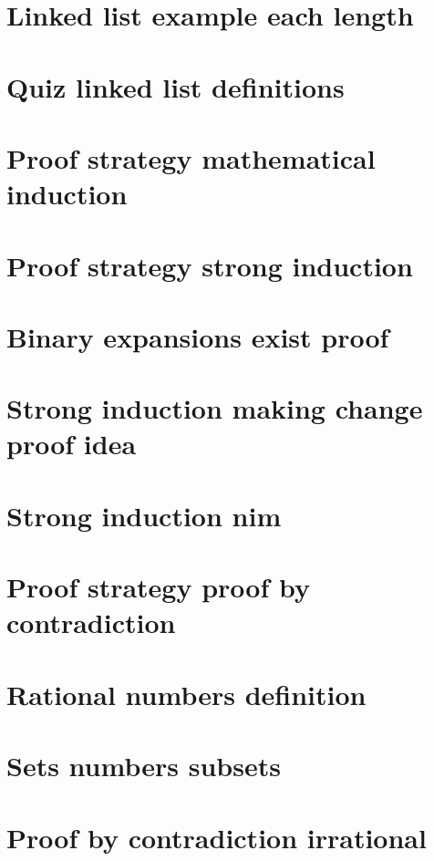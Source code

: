 \section*{Linked list example each length}

\vfill
\section*{Quiz linked list definitions}

\vfill
\section*{Proof strategy mathematical induction}

\vfill
\section*{Proof strategy strong induction}

\vfill
\section*{Binary expansions exist proof}

\vfill
\section*{Strong induction making change proof idea}

\vfill
\section*{Strong induction nim}

\vfill
\section*{Proof strategy proof by contradiction}

\vfill
\section*{Rational numbers definition}

\vfill
\section*{Sets numbers subsets}

\vfill
\section*{Proof by contradiction irrational}

\vfill
